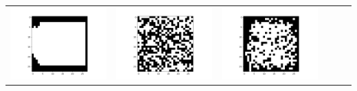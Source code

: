 \documentclass[12pt]{report}
\begin{document}
\begin{table}[H]
\begin{tabular}{  c  c  c  c  c  c }
\begin{minipage}{.15\textwidth}
      \includegraphics[scale=0.2]{BM_evisual.png}
    \end{minipage} & 
    \begin{minipage}{.15\textwidth}
      \includegraphics[scale=0.2]{BM_e1.png}
    \end{minipage} &
    \begin{minipage}{.15\textwidth}
      \includegraphics[scale=0.2]{BM_e2.png}

\end{minipage}
\end{tabular}
\end{table}
\end{document}
